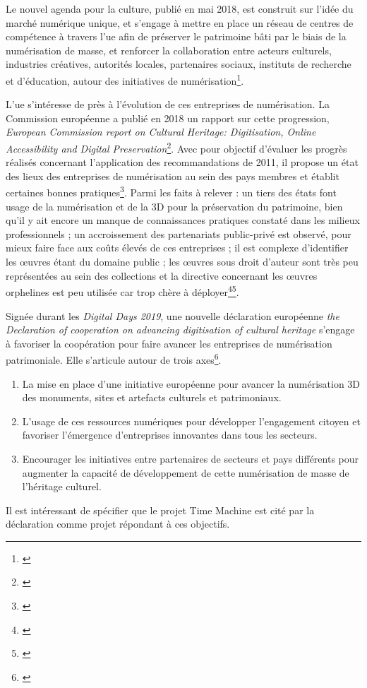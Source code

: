 Le nouvel agenda pour la culture, publié en mai 2018, est construit sur l'idée du marché numérique unique, et s'engage à mettre en place un réseau de centres de compétence à travers l'\gls{ue} afin de préserver le patrimoine bâti par le biais de la numérisation de masse, et renforcer la collaboration entre acteurs culturels, industries créatives, autorités locales, partenaires sociaux, instituts de recherche et d'éducation, autour des initiatives de numérisation\footnote{\cite{drennan_european_2018}}. 

L'\gls{ue} s'intéresse de près à l'évolution de ces entreprises de numérisation. La Commission européenne a publié en 2018 un rapport sur cette progression, \textit{European Commission report on Cultural Heritage: Digitisation, Online Accessibility and Digital Preservation}\footnote{\cite{noauthor_european_2019}}. Avec pour objectif d'évaluer les progrès réalisés concernant l'application des recommandations de 2011, il propose un état des lieux des entreprises de numérisation au sein des pays membres et établit certaines bonnes pratiques\footnote{\cite{noauthor_council_nodate}}. Parmi les faits à relever :  un tiers des états font usage de la numérisation et de la 3D pour la préservation du patrimoine, bien qu'il y ait encore un manque de connaissances pratiques constaté dans les milieux professionnels ; un accroissement des partenariats public-privé est observé, pour mieux faire face aux coûts élevés de ces entreprises ; il est complexe d'identifier les \oe{}uvres étant du domaine public ; les \oe{}uvres sous droit d'auteur sont très peu représentées au sein des collections et la directive concernant les \oe{}uvres orphelines est peu utilisée car trop chère à déployer\footnote{\cite{noauthor_european_2019}}\footnote{\cite{zeinstra_research:_2016}}.

Signée durant les \textit{Digital Days 2019}, une nouvelle déclaration européenne \textit{the Declaration of cooperation on advancing digitisation of cultural heritage} s'engage à favoriser la coopération pour faire avancer les entreprises de numérisation patrimoniale. Elle s'articule autour de trois axes\footnote{\cite{noauthor_eu_2019}}.
\begin{enumerate}
\item La mise en place d'une initiative européenne pour avancer la numérisation 3D des monuments, sites et artefacts culturels et patrimoniaux.
\item L'usage de ces ressources numériques pour développer l'engagement citoyen et favoriser l'émergence d'entreprises innovantes dans tous les secteurs.
\item Encourager les initiatives entre partenaires de secteurs et pays différents pour augmenter la capacité de développement de cette numérisation de masse de l'héritage culturel.
\end{enumerate}
Il est intéressant de spécifier que le projet Time Machine est cité par la déclaration comme projet répondant à ces objectifs.


